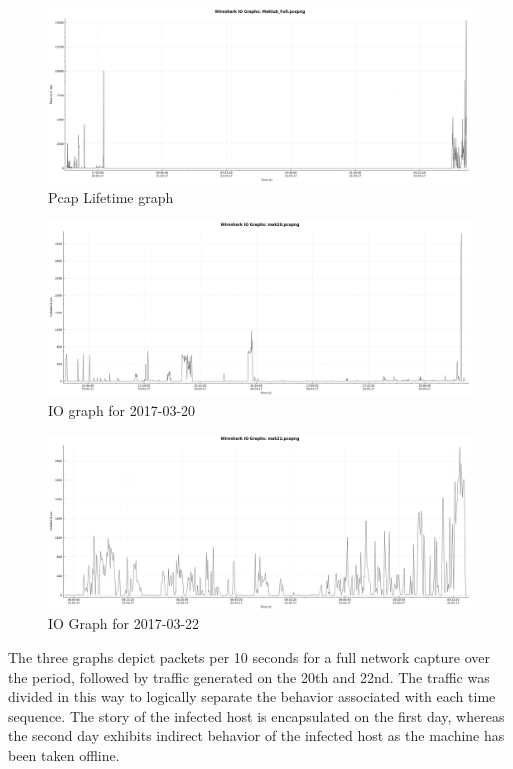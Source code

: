 \documentclass[11pt]{diazessay} %
\begin{document}
\begin{figure}[H]
        \centering
        \includegraphics[scale=0.30]{Maktub_Full.png}
    \caption{Pcap Lifetime graph}
\end{figure}

\begin{figure}[H]
        \centering
        \includegraphics[scale=0.30]{mak20.png}
    \caption{IO graph for 2017-03-20} 
\end{figure}

\begin{figure}[H]
        \centering
        \includegraphics[scale=0.30]{mak22.png}
    \caption{IO Graph for 2017-03-22}
\end{figure}


The three graphs depict packets per 10 seconds for a full network capture over the period, followed by traffic generated on the 20th and 22nd. The traffic was divided in this way to logically separate the behavior associated with each time sequence. The story of the infected host is encapsulated on the first day, whereas the second day exhibits indirect behavior of the infected host as the machine has been taken offline.  
\end{document}
